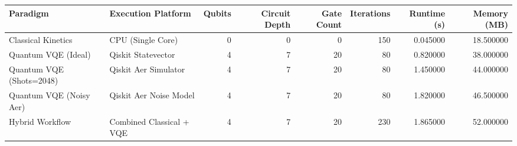 \begin{tabular}{llrrrrrr}
\toprule
Paradigm & Execution Platform & Qubits & Circuit Depth & Gate Count & Iterations & Runtime (s) & Memory (MB) \\
\midrule
Classical Kinetics & CPU (Single Core) & 0 & 0 & 0 & 150 & 0.045000 & 18.500000 \\
Quantum VQE (Ideal) & Qiskit Statevector & 4 & 7 & 20 & 80 & 0.820000 & 38.000000 \\
Quantum VQE (Shots=2048) & Qiskit Aer Simulator & 4 & 7 & 20 & 80 & 1.450000 & 44.000000 \\
Quantum VQE (Noisy Aer) & Qiskit Aer Noise Model & 4 & 7 & 20 & 80 & 1.820000 & 46.500000 \\
Hybrid Workflow & Combined Classical + VQE & 4 & 7 & 20 & 230 & 1.865000 & 52.000000 \\
\bottomrule
\end{tabular}
